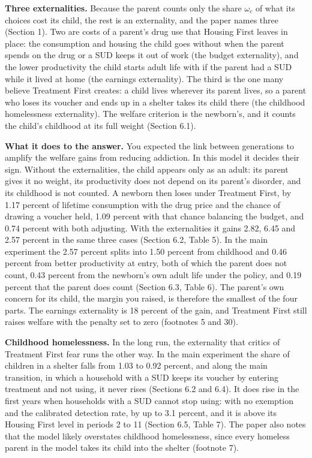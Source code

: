 \documentclass[11pt]{article}
\begin{document}
\begin{response}
\textbf{Three externalities.} Because the parent counts only the share $\omega_c$ of what
its choices cost its child, the rest is an externality, and the paper names three (Section
1). Two are costs of a parent's drug use that Housing First leaves in place: the
consumption and housing the child goes without when the parent spends on the drug or a SUD
keeps it out of work (the budget externality), and the lower productivity the child starts
adult life with if the parent had a SUD while it lived at home (the earnings externality).
The third is the one many believe Treatment First creates: a child lives wherever its
parent lives, so a parent who loses its voucher and ends up in a shelter takes its child
there (the childhood homelessness externality). The welfare criterion is the newborn's, and
it counts the child's childhood at its full weight (Section 6.1).

\textbf{What it does to the answer.} You expected the link between generations to amplify
the welfare gains from reducing addiction. In this model it decides their sign. Without the
externalities, the child appears only as an adult: its parent gives it no weight, its
productivity does not depend on its parent's disorder, and its childhood is not counted. A
newborn then loses under Treatment First, by 1.17 percent of lifetime consumption with the
drug price and the chance of drawing a voucher held, 1.09 percent with that chance
balancing the budget, and 0.74 percent with both adjusting. With the externalities it gains
2.82, 6.45 and 2.57 percent in the same three cases (Section 6.2, Table 5). In the main
experiment the 2.57 percent splits into 1.50 percent from childhood and 0.46 percent from
better productivity at entry, both of which the parent does not count, 0.43 percent from the
newborn's own adult life under the policy, and 0.19 percent that the parent does count
(Section 6.3, Table 6). The parent's own concern for its child, the margin you raised, is
therefore the smallest of the four parts. The earnings externality is 18 percent of the
gain, and Treatment First still raises welfare with the penalty set to zero (footnotes 5
and 30).

\textbf{Childhood homelessness.} In the long run, the externality that critics of
Treatment First fear runs the other way. In the main experiment the share of children in a
shelter falls from 1.03 to 0.92 percent, and along the main transition, in which a
household with a SUD keeps its voucher by entering treatment and not using, it never rises
(Sections 6.2 and 6.4). It does rise in the first years when households with a SUD cannot
stop using: with no exemption and the calibrated detection rate, by up to 3.1 percent, and
it is above its Housing First level in periods 2 to 11 (Section 6.5, Table 7). The paper
also notes that the model likely overstates childhood homelessness, since every homeless
parent in the model takes its child into the shelter (footnote 7).


\end{response}
\end{document}
